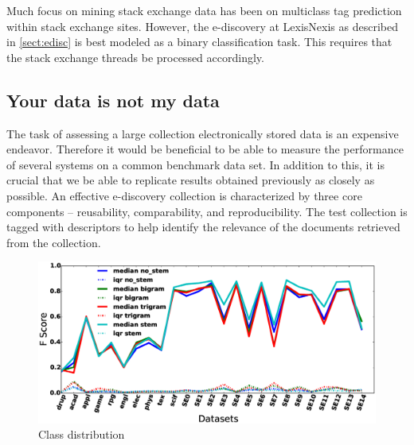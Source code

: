 \documentclass{sig-alternate-05-2015}
\newcommand{\tion}[1]{\textsection\ref{sect:#1}}
\begin{document}
Much focus on mining stack exchange data has been on multiclass tag prediction within stack exchange sites. However, the e-discovery at LexisNexis as described in \tion{edisc} is best modeled as a binary classification task. This requires that the stack exchange threads be processed accordingly. 

\subsection{Your data is not my data}
\label{sect:ydinmd}
The task of assessing a large collection electronically stored data is an expensive endeavor. Therefore it would be beneficial to be able to measure the performance of several systems on a common benchmark data set. In addition to this, it is crucial that we be able to replicate results obtained previously as closely as possible. An effective e-discovery collection is characterized by three core components -- reusability, comparability, and reproducibility. The test collection is tagged with descriptors to help identify the relevance of the documents retrieved from the collection. 

\begin{figure}[pbt]
    \includegraphics[width=0.99\linewidth]{./fig/pre.eps}
    \caption{Class distribution}
    \label{fig:token}
\end{figure}
\end{document}
